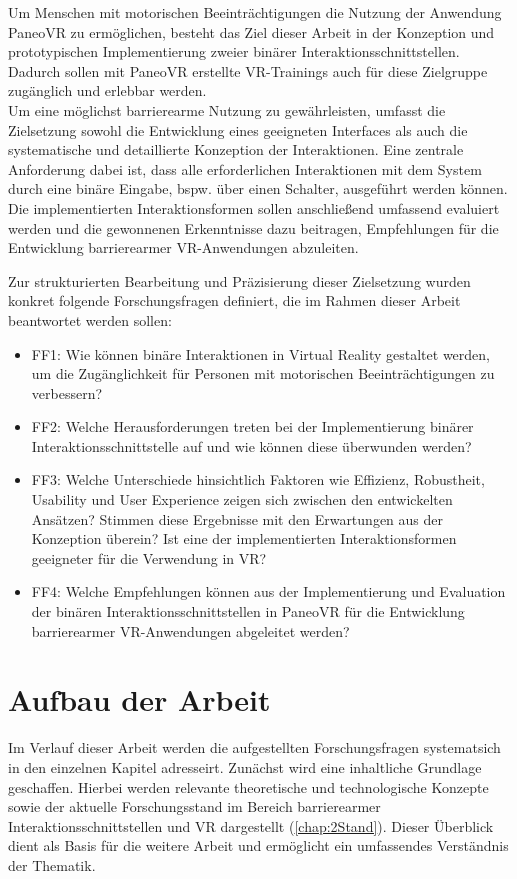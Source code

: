 Um Menschen mit motorischen Beeinträchtigungen die Nutzung der Anwendung PaneoVR zu ermöglichen, besteht das Ziel dieser Arbeit in der Konzeption und prototypischen Implementierung zweier binärer Interaktionsschnittstellen. Dadurch sollen mit PaneoVR erstellte VR-Trainings auch für diese Zielgruppe zugänglich und erlebbar werden.\\
Um eine möglichst barrierearme Nutzung zu gewährleisten, umfasst die Zielsetzung sowohl die Entwicklung eines geeigneten Interfaces als auch die systematische und detaillierte Konzeption der Interaktionen. Eine zentrale Anforderung dabei ist, dass alle erforderlichen Interaktionen mit dem System durch eine binäre Eingabe, bspw. über einen Schalter, ausgeführt werden können. Die implementierten Interaktionsformen sollen anschließend umfassend evaluiert werden und die gewonnenen Erkenntnisse dazu beitragen, Empfehlungen für die Entwicklung barrierearmer VR-Anwendungen abzuleiten.

Zur strukturierten Bearbeitung und Präzisierung dieser Zielsetzung wurden konkret folgende Forschungsfragen definiert, die im Rahmen dieser Arbeit beantwortet werden sollen:

\begin{itemize}
    \item FF1: Wie können binäre Interaktionen in Virtual Reality gestaltet werden, um die Zugänglichkeit für Personen mit motorischen Beeinträchtigungen zu verbessern?
    \item FF2: Welche Herausforderungen treten bei der Implementierung binärer Interaktionsschnittstelle auf und wie können diese überwunden werden?  
    \item FF3: Welche Unterschiede hinsichtlich Faktoren wie Effizienz, Robustheit, Usability und User Experience zeigen sich zwischen den entwickelten Ansätzen? Stimmen diese Ergebnisse mit den Erwartungen aus der Konzeption überein? Ist eine der implementierten Interaktionsformen geeigneter für die Verwendung in VR?
    \item FF4: Welche Empfehlungen können aus der Implementierung und Evaluation der binären Interaktionsschnittstellen in PaneoVR für die Entwicklung barrierearmer VR-Anwendungen abgeleitet werden?
\end{itemize}
 

\section{Aufbau der Arbeit}

Im Verlauf dieser Arbeit werden die aufgestellten Forschungsfragen systematsich in den einzelnen Kapitel adresseirt. Zunächst wird eine inhaltliche Grundlage geschaffen. Hierbei werden relevante theoretische und technologische Konzepte sowie der aktuelle Forschungsstand im Bereich barrierearmer Interaktionsschnittstellen und VR dargestellt (\autoref{chap:2Stand}). Dieser Überblick dient als Basis für die weitere Arbeit und ermöglicht ein umfassendes Verständnis der Thematik.

